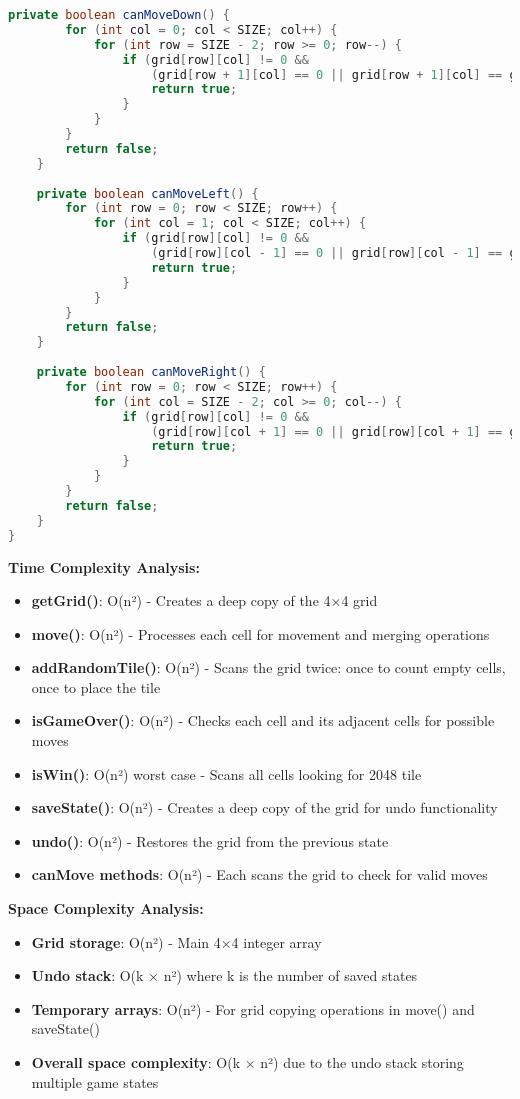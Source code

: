 \documentclass[12pt, a4paper]{article}
\begin{document}
\begin{lstlisting}[language=Java, caption=GameLogic Class Implementation]
    private boolean canMoveDown() {
        for (int col = 0; col < SIZE; col++) {
            for (int row = SIZE - 2; row >= 0; row--) {
                if (grid[row][col] != 0 && 
                    (grid[row + 1][col] == 0 || grid[row + 1][col] == grid[row][col])) {
                    return true;
                }
            }
        }
        return false;
    }
    
    private boolean canMoveLeft() {
        for (int row = 0; row < SIZE; row++) {
            for (int col = 1; col < SIZE; col++) {
                if (grid[row][col] != 0 && 
                    (grid[row][col - 1] == 0 || grid[row][col - 1] == grid[row][col])) {
                    return true;
                }
            }
        }
        return false;
    }
    
    private boolean canMoveRight() {
        for (int row = 0; row < SIZE; row++) {
            for (int col = SIZE - 2; col >= 0; col--) {
                if (grid[row][col] != 0 && 
                    (grid[row][col + 1] == 0 || grid[row][col + 1] == grid[row][col])) {
                    return true;
                }
            }
        }
        return false;
    }
}
\end{lstlisting}

\textbf{Time Complexity Analysis:}
\begin{itemize}
    \item \textbf{getGrid()}: O(n²) - Creates a deep copy of the 4×4 grid
    \item \textbf{move()}: O(n²) - Processes each cell for movement and merging operations
    \item \textbf{addRandomTile()}: O(n²) - Scans the grid twice: once to count empty cells, once to place the tile
    \item \textbf{isGameOver()}: O(n²) - Checks each cell and its adjacent cells for possible moves
    \item \textbf{isWin()}: O(n²) worst case - Scans all cells looking for 2048 tile
    \item \textbf{saveState()}: O(n²) - Creates a deep copy of the grid for undo functionality
    \item \textbf{undo()}: O(n²) - Restores the grid from the previous state
    \item \textbf{canMove methods}: O(n²) - Each scans the grid to check for valid moves
\end{itemize}

\textbf{Space Complexity Analysis:}
\begin{itemize}
    \item \textbf{Grid storage}: O(n²) - Main 4×4 integer array
    \item \textbf{Undo stack}: O(k × n²) where k is the number of saved states
    \item \textbf{Temporary arrays}: O(n²) - For grid copying operations in move() and saveState()
    \item \textbf{Overall space complexity}: O(k × n²) due to the undo stack storing multiple game states
\end{itemize}
\end{document}
